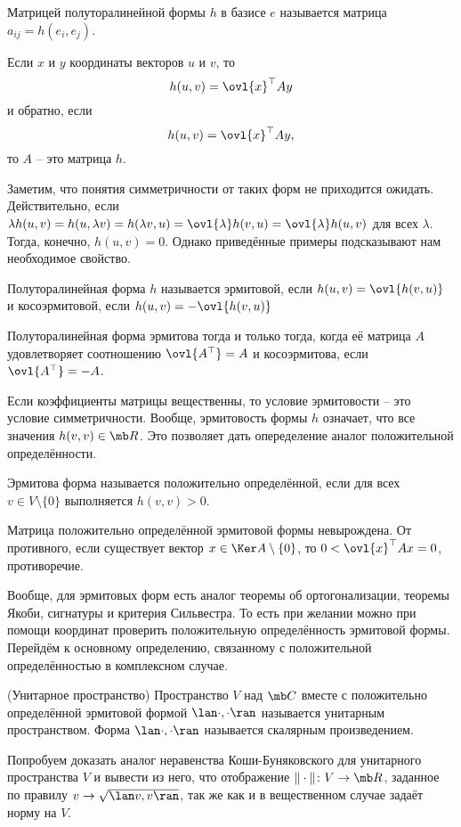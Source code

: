\dfn Матрицей полуторалинейной формы $h$
в базисе $e$ называется матрица $a_{ij}=h(e_i,e_j)$. 
\edfn

\lm Если $x$ и $y$ координаты векторов $u$ и $v$, то $$h(u,v)=\ovl{x}^{\top}Ay$$
и обратно, если $$h(u,v)=\ovl{x}^{\top}Ay,$$
то $A$ -- это матрица $h$.
\elm



Заметим, что понятия симметричности  от таких форм не приходится ожидать. Действительно, если $\lambda h(u,v)=h(u,\lambda v) = h(\lambda v,u)=\ovl{\lambda}h(v,u)=\ovl{\lambda}h(u,v)$ для всех $\lambda$. Тогда, конечно, $h(u,v)=0$. Однако приведённые примеры подсказывают нам необходимое свойство.

\dfn Полуторалинейная форма $h$ называется эрмитовой, если $h(u,v)=\ovl{h(v,u)}$ и косоэрмитовой, если $h(u,v)=-\ovl{h(v,u)}$
\edfn

\lm Полуторалинейная форма эрмитова тогда и только тогда, когда её матрица $A$ удовлетворяет соотношению $\ovl{A^{\top}}=A$ и косоэрмитова, если $\ovl{A^{\top}}=-A$.
\elm

Если коэффициенты матрицы вещественны, то условие эрмитовости -- это условие симметричности. Вообще, эрмитовость формы $h$ означает, что все значения $h(v,v) \in \mb R$. Это позволяет дать опеределение аналог положительной определённости. 


\dfn Эрмитова форма называется положительно определённой, если для всех $v\in V\setminus\{0\}$ выполняется $h(v,v)>0$.
\edfn

\lm Матрица положительно определённой эрмитовой формы невырождена.
\proof От противного, если существует вектор $x\in \Ker A\setminus\{0\}$, то $0<\ovl{x}^{\top}Ax = 0$, противоречие.
\endproof
\elm

Вообще, для эрмитовых форм есть аналог теоремы об ортогонализации, теоремы Якоби, сигнатуры и критерия Сильвестра. То есть при желании можно при помощи координат проверить положительную определённость эрмитовой формы. Перейдём к основному определению, связанному с положительной определённостью в комплексном случае.


\dfn(Унитарное пространство) Пространство $V$ над $\mb C$ вместе с положительно определённой эрмитовой формой $\lan \cdot, \cdot \ran$ называется унитарным пространством. Форма $\lan \cdot, \cdot \ran$ называется скалярным произведением.
\edfn

Попробуем доказать аналог неравенства Коши-Буняковского для унитарного пространства $V$ и вывести из него, что отображение $\|\cdot\| \colon V \to \mb R$, заданное по правилу $v\to \sqrt{\lan v,v\ran}$, так же как и в вещественном случае задаёт  норму на $V$.

